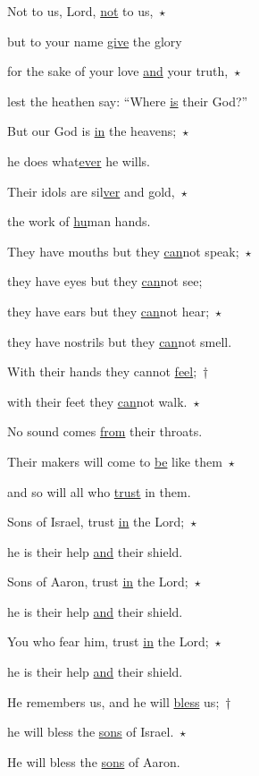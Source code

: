 \noindent Not to us, Lord, \uline{not} to us,~$\star$~

but to your name \uline{give} the glory

\noindent for the sake of your love \uline{and} your truth,~$\star$~

lest the heathen say: “Where \uline{is} their God?”



\noindent But our God is \uline{in} the heavens;~$\star$~

he does what\uline{ever} he wills.

\noindent Their idols are sil\uline{ver} and gold,~$\star$~

the work of \uline{hu}man hands.



\noindent They have mouths but they \uline{can}not speak;~$\star$~

they have eyes but they \uline{can}not see;

\noindent they have ears but they \uline{can}not hear;~$\star$~

they have nostrils but they \uline{can}not smell.



\noindent With their hands they cannot \uline{feel};~†~

with their feet they \uline{can}not walk.~$\star$~

No sound comes \uline{from} their throats.



\noindent Their makers will come to \uline{be} like them~$\star$~

and so will all who \uline{trust} in them.



\noindent Sons of Israel, trust \uline{in} the Lord;~$\star$~

he is their help \uline{and} their shield.

\noindent Sons of Aaron, trust \uline{in} the Lord;~$\star$~

he is their help \uline{and} their shield.



\noindent You who fear him, trust \uline{in} the Lord;~$\star$~

he is their help \uline{and} their shield.

\noindent He remembers us, and he will \uline{bless} us;~†~

he will bless the \uline{sons} of Israel.~$\star$~

He will bless the \uline{sons} of Aaron.



